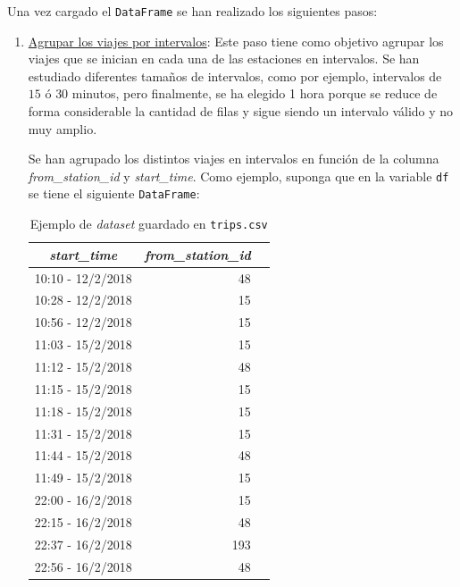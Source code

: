 Una vez cargado el \small\verb|DataFrame| se han realizado los siguientes pasos:
\begin{enumerate}
    \item \underline{Agrupar los viajes por intervalos}: Este paso tiene como objetivo agrupar los viajes que se inician en cada una de las estaciones en intervalos. Se han estudiado diferentes tamaños de intervalos, como por ejemplo, intervalos de $15$ ó $30$ minutos, pero finalmente, se ha elegido 1 hora porque se reduce de forma considerable la cantidad de filas y sigue siendo un intervalo válido y no muy amplio.
    \newline
    
    Se han agrupado los distintos viajes en intervalos en función de la columna \textit{from\_station\_id} y \textit{start\_time}. Como ejemplo, suponga que en la variable \small{\verb|df|} se tiene el siguiente \small{\verb|DataFrame|}:

    \begin{table}[H]
    \footnotesize
    \centering
    \begin{tabular}{c|rr}
        \toprule
          \textit{start\_time} & \textit{from\_station\_id}  \\
        \midrule
        
        10:10 - 12/2/2018 & 48\\
        10:28 - 12/2/2018 & 15\\
        10:56 - 12/2/2018 & 15\\
        11:03 - 15/2/2018 & 15\\
        11:12 - 15/2/2018 & 48\\
        11:15 - 15/2/2018 & 15\\
        11:18 - 15/2/2018 & 15\\
        11:31 - 15/2/2018 & 15\\
        11:44 - 15/2/2018 & 48\\
        11:49 - 15/2/2018 & 15\\
        22:00 - 16/2/2018 & 15\\
        22:15 - 16/2/2018 & 48\\
        22:37 - 16/2/2018 & 193\\
        22:56 - 16/2/2018 & 48\\
        \bottomrule
        
    \end{tabular}
    \cprotect\caption{Ejemplo de \textit{dataset} guardado en \small{\verb|trips.csv|}}
    \label{tab:starttime_withsid}
    \end{table}
    

\end{enumerate}
